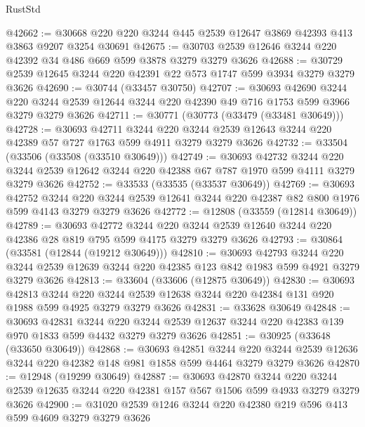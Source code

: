 \begin{lexlean}{RustStd}
\begin{coremodule}
@42662 := @30668 @220 @220 @3244 @445 @2539 @12647 @3869 @42393 @413 @3863 @9207 @3254 @30691
@42675 := @30703 @2539 @12646 @3244 @220 @42392 @34 @486 @669 @599 @3878 @3279 @3279 @3626
@42688 := @30729 @2539 @12645 @3244 @220 @42391 @22 @573 @1747 @599 @3934 @3279 @3279 @3626
@42690 := @30744 (@33457 @30750)
@42707 := @30693
    @42690
    @3244
    @220
    @3244
    @2539
    @12644
    @3244
    @220
    @42390
    @49
    @716
    @1753
    @599
    @3966
    @3279
    @3279
    @3626
@42711 := @30771 (@30773 (@33479 (@33481 @30649)))
@42728 := @30693
    @42711
    @3244
    @220
    @3244
    @2539
    @12643
    @3244
    @220
    @42389
    @57
    @727
    @1763
    @599
    @4911
    @3279
    @3279
    @3626
@42732 := @33504 (@33506 (@33508 (@33510 @30649)))
@42749 := @30693
    @42732
    @3244
    @220
    @3244
    @2539
    @12642
    @3244
    @220
    @42388
    @67
    @787
    @1970
    @599
    @4111
    @3279
    @3279
    @3626
@42752 := @33533 (@33535 (@33537 @30649))
@42769 := @30693
    @42752
    @3244
    @220
    @3244
    @2539
    @12641
    @3244
    @220
    @42387
    @82
    @800
    @1976
    @599
    @4143
    @3279
    @3279
    @3626
@42772 := @12808 (@33559 (@12814 @30649))
@42789 := @30693
    @42772
    @3244
    @220
    @3244
    @2539
    @12640
    @3244
    @220
    @42386
    @28
    @819
    @795
    @599
    @4175
    @3279
    @3279
    @3626
@42793 := @30864 (@33581 (@12844 (@19212 @30649)))
@42810 := @30693
    @42793
    @3244
    @220
    @3244
    @2539
    @12639
    @3244
    @220
    @42385
    @123
    @842
    @1983
    @599
    @4921
    @3279
    @3279
    @3626
@42813 := @33604 (@33606 (@12875 @30649))
@42830 := @30693
    @42813
    @3244
    @220
    @3244
    @2539
    @12638
    @3244
    @220
    @42384
    @131
    @920
    @1988
    @599
    @4925
    @3279
    @3279
    @3626
@42831 := @33628 @30649
@42848 := @30693
    @42831
    @3244
    @220
    @3244
    @2539
    @12637
    @3244
    @220
    @42383
    @139
    @970
    @1833
    @599
    @4432
    @3279
    @3279
    @3626
@42851 := @30925 (@33648 (@33650 @30649))
@42868 := @30693
    @42851
    @3244
    @220
    @3244
    @2539
    @12636
    @3244
    @220
    @42382
    @148
    @981
    @1858
    @599
    @4464
    @3279
    @3279
    @3626
@42870 := @12948 (@19299 @30649)
@42887 := @30693
    @42870
    @3244
    @220
    @3244
    @2539
    @12635
    @3244
    @220
    @42381
    @157
    @567
    @1506
    @599
    @4933
    @3279
    @3279
    @3626
@42900 := @31020 @2539 @1246 @3244 @220 @42380 @219 @596 @413 @599 @4609 @3279 @3279 @3626

\end{coremodule}
\end{lexlean}
